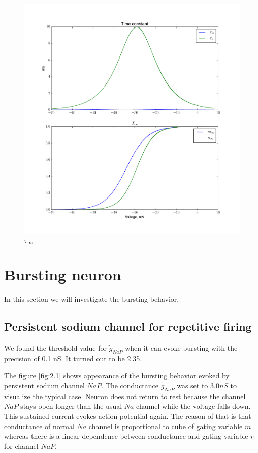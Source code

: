\documentclass[a4paper,11pt]{article} %
\begin{document}
\begin{figure}[H]
    \centering
    \includegraphics[width=\textwidth]{tau_inf}
    \caption{$\tau_\infty$}
    \label{fig:tau_inf}
\end{figure}

\section{Bursting neuron}

In this section we will investigate the bursting behavior.

\subsection{Persistent sodium channel for repetitive firing}

We found the threshold value for $\tilde{g}_{NaP}$ when it can evoke bursting 
with the precision of 0.1 nS. It turned out to be 2.35.


The figure \ref{fig:2.1} shows appearance of the bursting behavior evoked by 
persistent sodium channel $NaP$. The conductance $\tilde{g}_{NaP}$ was
set to $3.0 nS$ to visualize the typical case. Neuron does not return
to rest because the channel $NaP$ stays open longer than the usual $Na$ channel
while the voltage falls down. This sustained current evokes action potential
again. The reason of that is that conductance of normal $Na$ channel is 
proportional to cube of gating variable $m$ whereas there is a linear dependence
between conductance and gating variable $r$ for channel $NaP$.
\end{document}
